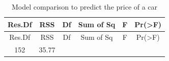 \documentclass[]{article}
\begin{document}
\begin{longtable}[]{@{}cccccc@{}}
\caption{Model comparison to predict the price of a car}\tabularnewline
\toprule
\begin{minipage}[b]{0.10\columnwidth}\centering\strut
Res.Df\strut
\end{minipage} & \begin{minipage}[b]{0.09\columnwidth}\centering\strut
RSS\strut
\end{minipage} & \begin{minipage}[b]{0.06\columnwidth}\centering\strut
Df\strut
\end{minipage} & \begin{minipage}[b]{0.14\columnwidth}\centering\strut
Sum of Sq\strut
\end{minipage} & \begin{minipage}[b]{0.12\columnwidth}\centering\strut
F\strut
\end{minipage} & \begin{minipage}[b]{0.13\columnwidth}\centering\strut
Pr(\textgreater{}F)\strut
\end{minipage}\tabularnewline
\midrule
\endfirsthead
\toprule
\begin{minipage}[b]{0.10\columnwidth}\centering\strut
Res.Df\strut
\end{minipage} & \begin{minipage}[b]{0.09\columnwidth}\centering\strut
RSS\strut
\end{minipage} & \begin{minipage}[b]{0.06\columnwidth}\centering\strut
Df\strut
\end{minipage} & \begin{minipage}[b]{0.14\columnwidth}\centering\strut
Sum of Sq\strut
\end{minipage} & \begin{minipage}[b]{0.12\columnwidth}\centering\strut
F\strut
\end{minipage} & \begin{minipage}[b]{0.13\columnwidth}\centering\strut
Pr(\textgreater{}F)\strut
\end{minipage}\tabularnewline
\midrule
\endhead
\begin{minipage}[t]{0.10\columnwidth}\centering\strut
152\strut
\end{minipage} & \begin{minipage}[t]{0.09\columnwidth}\centering\strut
35.77\strut
\end{minipage} & \begin{minipage}[t]{0.06\columnwidth}\centering\strut

\end{minipage}
\end{longtable}
\end{document}
